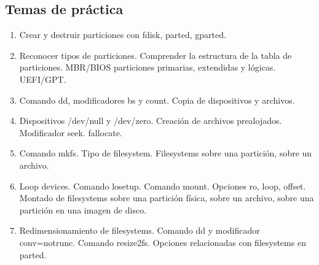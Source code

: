 \subsection{Temas de práctica}
\begin{enumerate}
	\item Crear y destruir particiones con fdisk, parted, gparted. 
	\item Reconocer tipos de particiones. Comprender la estructura de la tabla de particiones. MBR/BIOS particiones primarias, extendidas y lógicas. UEFI/GPT. 
	\item Comando dd, modificadores bs y count. Copia de dispositivos y archivos.
	\item Dispositivos /dev/null y /dev/zero. Creación de archivos prealojados. Modificador seek. fallocate. 
	\item Comando mkfs. Tipo de filesystem. Filesystems sobre una partición, sobre un archivo.
	\item Loop devices. Comando losetup. Comando mount. Opciones ro, loop, offset. Montado de filesystems sobre una partición física, sobre un archivo, sobre una partición en una imagen de disco.
	\item Redimensionamiento de filesystems. Comando dd y modificador conv=notrunc. Comando resize2fs. Opciones relacionadas con filesystems en parted.
\end{enumerate}

